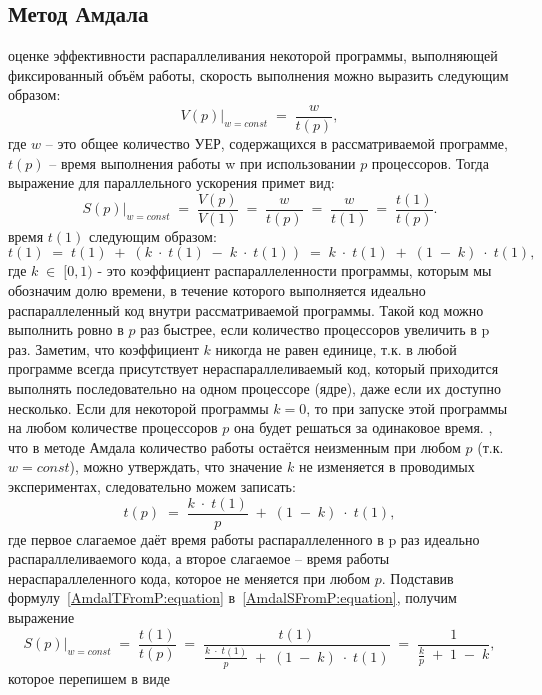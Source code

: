 { %
	\subsection{Метод Амдала}
	\Large{} оценке эффективности распараллеливания некоторой программы, выполняющей фиксированный объём работы, скорость выполнения можно выразить следующим образом:
	\begin{equation}
		\left.V(p)\right|_{w=const}\;=\;\frac w{t(p)},
	\end{equation}
	где $w$ – это общее количество УЕР, содержащихся в рассматриваемой программе, $t(p)$ – время выполнения работы w при использовании $p$ процессоров. Тогда выражение для параллельного ускорения примет вид:
	\begin{equation}
		\label{AmdalSFromP:equation}
		\left.S(p)\right|_{w=const}\;=\;\frac{V(p)}{V(1)}\;=\;\frac w{t(p)}\;=\;\frac w{t(1)}\;=\;\frac{t(1)}{t(p)}.
	\end{equation}
	 время $t(1)$ следующим образом:
	\begin{equation}
		t(1)\;=\;t(1)\;+\;(k\;\cdot\;t(1)\;-\;k\;\cdot\;t(1))\;=\;k\;\cdot\;t(1)\;+\;(1\;-\;k)\;\cdot\;t(1),
	\end{equation}
	где $k\;\in\;\lbrack0,1)$ - это коэффициент распараллеленности программы, которым мы обозначим долю времени, в течение которого выполняется идеально распараллеленный код внутри рассматриваемой программы. Такой код можно выполнить ровно в $p$ раз быстрее, если количество процессоров увеличить в p раз. Заметим, что коэффициент $k$ никогда не равен единице, т.к. в любой программе всегда присутствует нераспараллеливаемый код, который приходится выполнять последовательно на одном процессоре (ядре), даже если их доступно несколько. Если для некоторой программы $k=0$, то при запуске этой программы на любом количестве процессоров $p$ она будет решаться за одинаковое время.
	, что в методе Амдала количество работы остаётся неизменным при любом $p$ (т.к. $w=const$), можно утверждать, что значение $k$ не изменяется в проводимых экспериментах, следовательно можем записать:
	\begin{equation}
		\label{AmdalTFromP:equation}
		t(p)\;=\;\frac{k\;\cdot\;t(1)}p\;+\;(1\;-\;k)\;\cdot\;t(1),
	\end{equation}
	где первое слагаемое даёт время работы распараллеленного в p раз идеально распараллеливаемого кода, а второе слагаемое – время работы нераспараллеленного кода, которое не меняется при любом $p$. Подставив формулу~\eqref{AmdalTFromP:equation} в~\eqref{AmdalSFromP:equation}, получим выражение $$\left.S(p)\right|_{w=const}\;=\;\frac{t(1)}{t(p)}\;=\;\frac{t(1)}{{\displaystyle\frac{k\;\cdot\;t(1)}p}\;+\;(1\;-\;k)\;\cdot\;t(1)}\;=\;\frac1{{\displaystyle\frac kp}\;+\;1\;-\;k},$$ которое перепишем в виде
}
